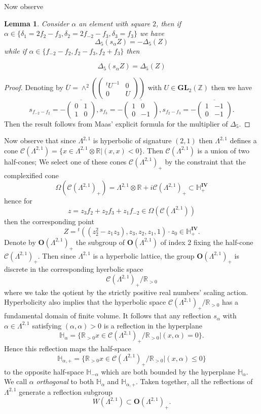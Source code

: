 \documentclass[9pt]{amsart} \usepackage[utf8]{inputenc}
\newtheorem{lemma}{Lemma}
\newcommand{\Z}{\mathbb{Z}} \newcommand{\C}{\mathbb{C}}
\newcommand{\R}{\mathbb{R}} \newcommand{\La}{\Lambda}
\newcommand{\GL}{\mathbf{GL}}
\newcommand{\Orth}{\mathbf{O}}
\newcommand{\Hpl}{\mathbb{H}}
\newcommand{\IV}{\mathbf{IV}}
\newcommand{\Cone}{\mathcal{C}}
\begin{document}
Now observe
\begin{lemma}
Consider $\alpha$ an element with square $2$, then if $\alpha \in
\{\delta_1 = 2f_2 -f_3, \delta_2 = 2f_{-2} - f_3, \delta_3 = f_3\}$ we
have
$$\Delta_5(s_{\alpha}Z) = - \Delta_5(Z)$$
while if $\alpha \in \{f_{-2} - f_2, f_2 - f_3, f_2 + f_3\}$ then

$$\Delta_5(s_{\alpha}Z) = \Delta_5(Z)$$
\end{lemma}
\begin{proof}
Denoting by $\overline{U} = \wedge^2(\begin{pmatrix}{}^tU^{-1} & 0\\ 0 & U\end{pmatrix})$ with $U \in \GL_2(\Z)$ then we have
$$s_{f_{-2} - f_2} = -\overline{\begin{pmatrix}0 & 1\\ 1 &0\end{pmatrix}}, s_{f_3} = - \overline{\begin{pmatrix}1& 0\\  0 &-1\end{pmatrix}}, s_{f_2 - f_3} =
-\overline{\begin{pmatrix}1 & -1\\ 0 & -1\end{pmatrix}}.$$ Then the result follows from Maas' explicit
formula for the multiplier of $\Delta_5.$
\end{proof}

Now observe that since $\La^{2,1}$ is hyperbolic of signature $(2,1)$
then $\La^{2,1}$ defines a cone $\Cone(\La^{2,1}) = \{ x \in \La^{2,1}
\otimes \R | (x,x) < 0\}$. Then $\Cone(\La^{2,1})$ is a union of two
half-cones; We select one of these cones $\Cone(\La^{2,1})_+$ by the
constraint that the complexified cone $$\Omega(\Cone(\La^{2,1})_+) = \La^{2,1} \otimes \R
+i\Cone(\La^{2,1})_+ \subset \Hpl^{\IV}_+$$ hence for $$z = z_3 f_2 + z_2
f_3 + z_1 f_{-2} \in \Omega(\Cone(\La^{2,1}))$$ then the corresponding
point $$Z = {}^t ((z_2^2 - z_1z_3), z_3, z_2, z_1, 1) \cdot z_0 \in
\Hpl^{\IV}_+.$$ Denote by $\Orth(\La^{2,1})_+$ the subgroup of
$\Orth(\La^{2,1})$ of index 2 fixing the half-cone
$\Cone(\Lambda^{2,1})_+$. Then since $\La^{2,1}$ is a hyperbolic
lattice, the group $\Orth(\La^{2,1})_+$ is discrete in the corresponding
hyerbolic space $$\Cone(\La^{2,1})_+ / \R_{>0}$$ where we take the
qotient by the strictly positive real numbers' scaling action.
Hyperbolicity also implies that the hyperbolic space
$\Cone(\La^{2,1})_+ / \R_{>0}$ has a fundamental domain of finite
volume. It follows that any reflection $s_{\alpha}$ with $\alpha \in
\La^{2,1}$ satisfying $(\alpha,\alpha) > 0$ is a reflection in the
hyperplane $$\Hpl_{\alpha} = \{ \R_{>0}x \in \Cone(\La^{2,1})_+/\R_{>0} |
(x,\alpha) = 0\}.$$ Hence this reflection maps the half-space
$$\Hpl_{\alpha,+} = \{\R_{>0} x \in \Cone(\La^{2,1})_+/\R_{>0} |
(x,\alpha) \leq  0\}$$ to the opposite half-space $\Hpl_{-\alpha}$ which
are both bounded by the hyperplane $\Hpl_{\alpha}$. We call $\alpha$
\textit{orthogonal} to both $\Hpl_{\alpha}$ and $\Hpl_{\alpha,+}$. Taken
together, all the reflections of $\Lambda^{2,1}$ generate a reflection
subgroup $$W(\La^{2,1}) \subset \Orth(\La^{2,1})_+.$$
\end{document}
